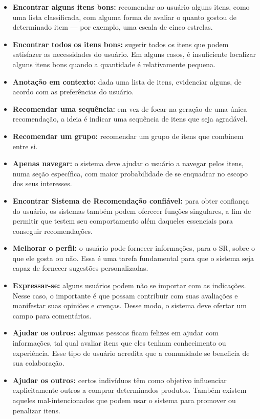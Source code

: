 \documentclass[portuguese]{textolivre}
\begin{document}
\begin{itemize}
    \item \textbf{Encontrar alguns itens bons:} recomendar ao usuário alguns itens, como uma lista classificada, com alguma forma de avaliar o quanto gostou de determinado item — por exemplo, uma escala de cinco estrelas.
    
    \item \textbf{Encontrar todos os itens bons:} sugerir todos os itens que podem satisfazer as necessidades do usuário. Em alguns casos, é insuficiente localizar alguns itens bons quando a quantidade é relativamente pequena.
    
    \item \textbf{Anotação em contexto:} dada uma lista de itens, evidenciar alguns, de acordo com as preferências do usuário.
    
    \item \textbf{Recomendar uma sequência:} em vez de focar na geração de uma única recomendação, a ideia é indicar uma sequência de itens que seja agradável.
    
    \item \textbf{Recomendar um grupo:} recomendar um grupo de itens que combinem entre si.
    
    \item \textbf{Apenas navegar:} o sistema deve ajudar o usuário a navegar pelos itens, numa seção específica, com maior probabilidade de se enquadrar no escopo dos seus interesses.
    
    \item \textbf{Encontrar Sistema de Recomendação confiável:} para obter confiança do usuário, os sistemas também podem oferecer funções singulares, a fim de permitir que testem seu comportamento além daqueles essenciais para conseguir recomendações.
    
    \item \textbf{Melhorar o perfil:} o usuário pode fornecer informações, para o SR, sobre o que ele gosta ou não. Essa é uma tarefa fundamental para que o sistema seja capaz de fornecer sugestões personalizadas.
    
    \item \textbf{Expressar-se:} alguns usuários podem não se importar com as indicações. Nesse caso, o importante é que possam contribuir com suas avaliações e manifestar suas opiniões e crenças. Desse modo, o sistema deve ofertar um campo para comentários.
    
    \item \textbf{Ajudar os outros:} algumas pessoas ficam felizes em ajudar com informações, tal qual avaliar itens que eles tenham conhecimento ou experiência. Esse tipo de usuário acredita que a comunidade se beneficia de sua colaboração.
    
    \item \textbf{Ajudar os outros:} certos indivíduos têm como objetivo influenciar explicitamente outros a comprar determinados produtos. Também existem aqueles mal-intencionados que podem usar o sistema para promover ou penalizar itens.
    
\end{itemize}
\end{document}
